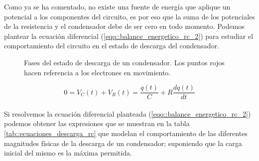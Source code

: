 \documentclass[../main.tex]{subfiles}
\begin{document}
Como ya se ha comentado, no existe una fuente de energía que aplique un potencial a los componentes del circuito, es por eso que la suma de los potenciales de la resistencia y el condensador debe de ser cero en todo momento. Podemos plantear la ecuación diferencial (\ref{eqq::balance_energetico_rc_2}) para estudiar el comportamiento del circuito en el estado de descarga del condensador.

\begin{figure}[!h]
    \centering
    \caption{Fases del estado de descarga de un condensador. Los puntos rojos hacen referencia a los electrones en movimiento.}
    \label{fig::descarga_condensador}
\end{figure}
\begin{equation}
    0 = V_C(t) + V_R(t) = \frac{q(t)}{C} + R\frac{d q(t)}{d t}
    \label{eqq::balance_energetico_rc_2}
\end{equation}
\hphantom{1}\\
Si resolvemos la ecuación diferencial planteada (\ref{eqq::balance_energetico_rc_2}) podemos obtener las expresiones que se muestran en la tabla \ref{tab::ecuaciones_descarga_rc} que modelan el comportamiento de las diferentes magnitudes físicas de la descarga de un condensador; suponiendo que la carga inicial del mismo es la máxima permitida.\\
\end{document}
